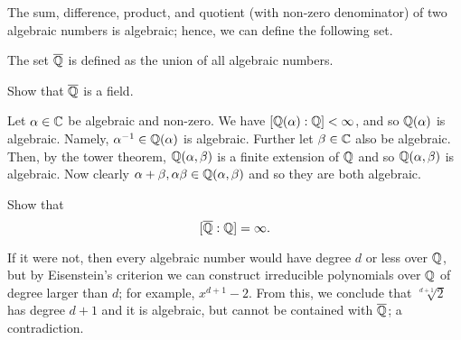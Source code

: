The sum, difference, product, and quotient (with non-zero denominator)
of two algebraic numbers is algebraic; hence, we can define the
following set.

\begin{definition}
	The set $\overline {\mathbb{Q}}$ is defined as the union of all algebraic numbers.
\end{definition}

\begin{problem}
	Show that $\overline{\mathbb{Q}}$ is a field.
\end{problem}

\begin{solution}
	Let $\alpha \in \mathbb{C}$ be algebraic and non-zero.
	We have $[\mathbb{Q}(\alpha) : \mathbb{Q}] < \infty$, and so
	$\mathbb{Q}(\alpha)$ is algebraic.
	Namely, $\alpha^{-1} \in \mathbb{Q}(\alpha)$ is algebraic.
	Further let $\beta \in \mathbb{C}$ also be algebraic.
	Then, by the tower theorem, $\mathbb{Q}(\alpha, \beta)$
	is a finite extension of $\mathbb{Q}$ and so 
	$\mathbb{Q}(\alpha, \beta)$ is algebraic.
	Now clearly $\alpha + \beta, \alpha\beta \in \mathbb{Q}(\alpha, \beta)$
	and so they are both algebraic.
\end{solution}

\begin{problem}
	Show that
	\[
		[\overline{\mathbb{Q}}: \mathbb{Q}] = \infty.
	\]
\end{problem}

\begin{solution}
	If it were not, then every algebraic number would have degree
	$d$ or less over $\mathbb{Q}$, but by Eisenstein's criterion we can construct
	irreducible polynomials over $\mathbb{Q}$ of degree larger than $d$;
	for example, $x^{d+1}-2$.
	From this, we conclude that $\sqrt[d+1]{2}$ has degree $d + 1$
	and it is algebraic, but cannot be contained with $\overline{\mathbb{Q}}$;
	a contradiction.
\end{solution}
